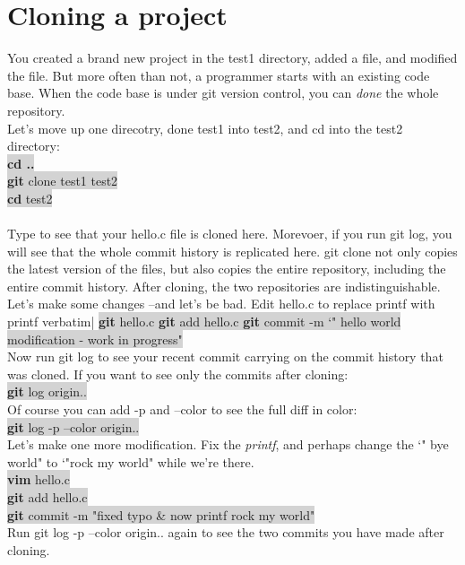 \documentclass{article}
\begin{document}
  \section{\textbf{Cloning a project}}
  You created a brand new project in the test1 directory, added a file, and modified the file. But more often than not, a programmer starts with an existing code base. When the code base is under git version control, you can \textit{done} the whole repository.\\
  Let's move up one direcotry, done test1 into test2, and cd into the test2 directory:\\
  \colorbox{lightgray}{
	  \textbf{cd ..}\\
	  \textbf{git} clone test1 test2\\
	  \textbf{cd} test2\\
  }\\
  Type  to see that your hello.c file is cloned here. Morevoer, if you run git log, you will see that the whole commit history is replicated here. git clone not only copies the latest version of the files, but also copies the entire repository, including the entire commit history. After cloning, the two repositories are indistinguishable.\\
  Let's make some changes --and let's be bad. Edit hello.c to replace printf with printf verbatim|%
  \colorbox{lightgray}{
	  \textbf{git} hello.c
  }
  \colorbox{lightgray}{
	  \textbf{git} add hello.c
  }
  \colorbox{lightgray}{
	  \textbf{git} commit -m `" hello world modification - work in progress"\\
  }
  Now run git log to see your recent commit carrying on the commit history that was cloned. If you want to see only the commits after cloning:\\
  \colorbox{lightgray}{
	  \textbf{git} log origin..\\
  }
  Of course you can add -p and --color to see the full diff in color:\\
  \colorbox{lightgray}{
	  \textbf{git} log -p --color origin..\\
  }
  Let's make one more modification. Fix the \textit{printf}, and perhaps change the `" bye world" to `"rock my world" while we're there.\\
  \colorbox{lightgray}{
	  \textbf{vim} hello.c\\
  }
  \colorbox{lightgray}{
	  \textbf{git} add hello.c\\
  }
  \colorbox{lightgray}{
	  \textbf{git} commit -m "fixed typo & now printf rock my world"\\
  }
  Run git log -p --color origin.. again to see the two commits you have made after cloning.\\
\end{document}
